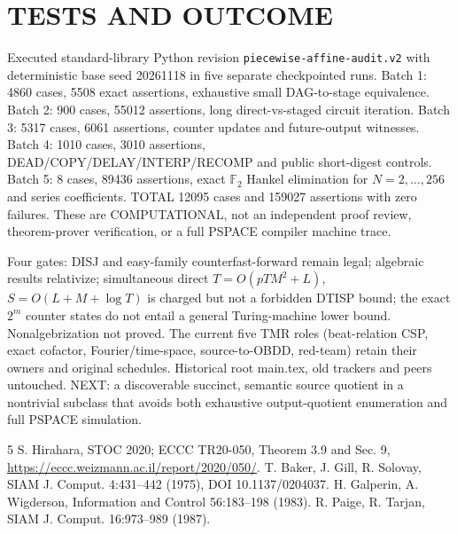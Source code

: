 \documentclass[11pt]{article}
\begin{document}
\section{TESTS AND OUTCOME}
Executed standard-library Python revision \texttt{piecewise-affine-audit.v2} with deterministic base seed 20261118 in five separate checkpointed runs. Batch 1: 4860 cases, 5508 exact assertions, exhaustive small DAG-to-stage equivalence. Batch 2: 900 cases, 55012 assertions, long direct-vs-staged circuit iteration. Batch 3: 5317 cases, 6061 assertions, counter updates and future-output witnesses. Batch 4: 1010 cases, 3010 assertions, DEAD/COPY/DELAY/INTERP/RECOMP and public short-digest controls. Batch 5: 8 cases, 89436 assertions, exact $\mathbb F_2$ Hankel elimination for $N=2,\ldots,256$ and series coefficients. TOTAL 12095 cases and 159027 assertions with zero failures. These are COMPUTATIONAL, not an independent proof review, theorem-prover verification, or a full PSPACE compiler machine trace.

Four gates: DISJ and easy-family counterfast-forward remain legal; algebraic results relativize; simultaneous direct $T=O(pTM^2+L)$, $S=O(L+M+\log T)$ is charged but not a forbidden DTISP bound; the exact $2^m$ counter states do not entail a general Turing-machine lower bound. Nonalgebrization not proved. The current five TMR roles (beat-relation CSP, exact cofactor, Fourier/time-space, source-to-OBDD, red-team) retain their owners and original schedules. Historical root main.tex, old trackers and peers untouched. NEXT: a discoverable succinct, semantic source quotient in a nontrivial subclass that avoids both exhaustive output-quotient enumeration and full PSPACE simulation.

\begin{thebibliography}{5}
 S. Hirahara, STOC 2020; ECCC TR20-050, Theorem 3.9 and Sec. 9, \url{https://eccc.weizmann.ac.il/report/2020/050/}.
 T. Baker, J. Gill, R. Solovay, SIAM J. Comput. 4:431--442 (1975), DOI 10.1137/0204037.
 H. Galperin, A. Wigderson, Information and Control 56:183--198 (1983).
 R. Paige, R. Tarjan, SIAM J. Comput. 16:973--989 (1987).
\end{thebibliography}
\end{document}
